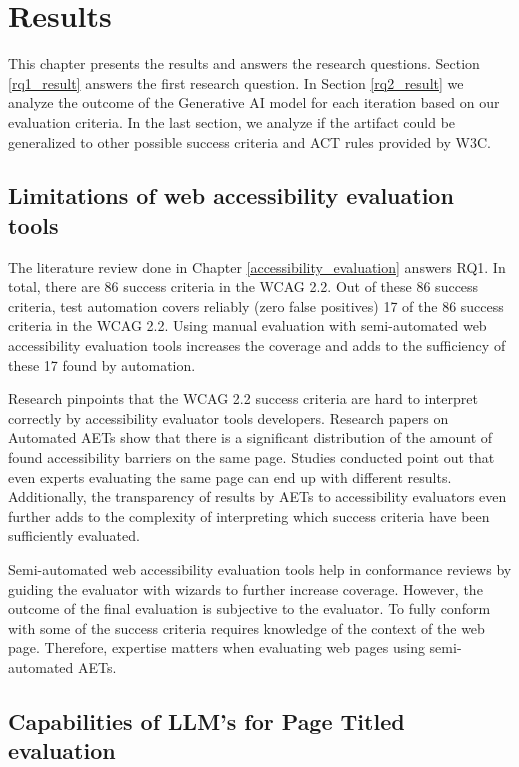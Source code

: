 \chapter{Results\label{results}}

This chapter presents the results and answers the research questions. Section \ref{rq1_result} answers the first research question. In Section \ref{rq2_result} we analyze the outcome of the Generative AI model for each iteration based on our evaluation criteria. In the last section, we analyze if the artifact could be generalized to other possible success criteria and ACT rules provided by W3C.

\section{Limitations of web accessibility evaluation tools\label{rq1_result}}

The literature review done in Chapter \ref{accessibility_evaluation} answers RQ1. In total, there are 86 success criteria in the WCAG 2.2. Out of these 86 success criteria, test automation covers reliably (zero false positives) 17 of the 86 success criteria in the WCAG 2.2. Using manual evaluation with semi-automated web accessibility evaluation tools increases the coverage and adds to the sufficiency of these 17 found by automation.

Research pinpoints that the WCAG 2.2 success criteria are hard to interpret correctly by accessibility evaluator tools developers. Research papers on Automated AETs show that there is a significant distribution of the amount of found accessibility barriers on the same page. Studies conducted point out that even experts evaluating the same page can end up with different results. Additionally, the transparency of results by AETs to accessibility evaluators even further adds to the complexity of interpreting which success criteria have been sufficiently evaluated.

Semi-automated web accessibility evaluation tools help in conformance reviews by guiding the evaluator with wizards to further increase coverage. However, the outcome of the final evaluation is subjective to the evaluator. To fully conform with some of the success criteria requires knowledge of the context of the web page. Therefore, expertise matters when evaluating web pages using semi-automated AETs.

\section{Capabilities of LLM's for Page Titled evaluation\label{rq2_result}}

